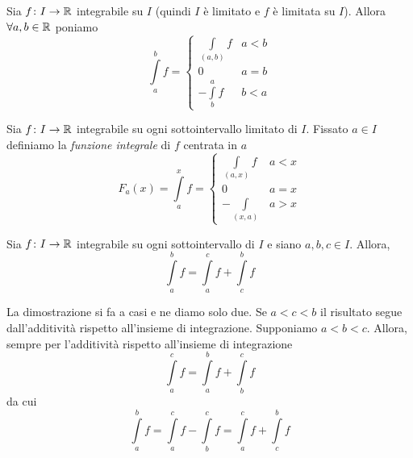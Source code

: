 \documentclass[a4paper]{article}
\begin{document}
\begin{radioactive}
\begin{snippetdefinition}{}
    Sia \(f\colon I \to \mathbb{R}\) integrabile su \(I\) (quindi \(I\) è limitato e \(f\) è limitata su \(I\)).
    Allora \(\forall a,b\in\mathbb{R}\) poniamo
    \[
        \int\limits_a^b f = \begin{cases}
            \int\limits_{(a,b)} f & a<b \\
            0 & a=b \\
            - \int\limits_b^a f & b<a
        \end{cases}
    \]
\end{snippetdefinition}
\end{radioactive}

\begin{snippetdefinition}{}
    Sia \(f\colon I \to \mathbb{R}\) integrabile su ogni sottointervallo limitato di \(I\).
    Fissato \(a\in I\) definiamo la \emph{funzione integrale} di \(f\) centrata in \(a\)
    \[
        F_a (x) = \int\limits_{a}^x f = \begin{cases}
            \int\limits_{(a,x)} f & a<x \\
            0 & a=x \\
            - \int\limits_{(x,a)} & a>x
        \end{cases}
    \]
\end{snippetdefinition}

\begin{snippetlemma}{}
    Sia \(f\colon I \to \mathbb{R}\) integrabile su ogni sottointervallo di \(I\)
    e siano \(a,b,c \in I\). Allora,
    \[
        \int\limits_a^b f = \int\limits_a^c f + \int\limits_c^b f
    \]
\end{snippetlemma}

\begin{snippetproof}{}
    La dimostrazione si fa a casi e ne diamo solo due.
    Se \(a<c<b\) il risultato segue dall'additività rispetto all'insieme di integrazione.
    Supponiamo \(a<b<c\). Allora, sempre per l'additività rispetto all'insieme di integrazione
    \[
        \int\limits_a^c f = \int\limits_a^b f + \int\limits_b^c f
    \]
    da cui
    \[
        \int\limits_a^b f = \int\limits_a^c f - \int\limits_b^c f
        = \int\limits_a^c f + \int\limits_c^b f
    \]
\end{snippetproof}

\end{document}
